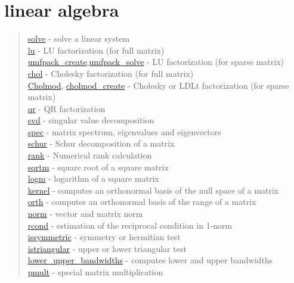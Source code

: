 \chapter*{linear algebra}

\begin{quote}
\noindent
\hyperlink{solve}{solve} - solve a linear system\\
\hyperlink{lu}{lu} - LU factorization (for full matrix) \\
\hyperlink{umfpack_create}{umfpack\_create},\hyperlink{umfpack_solve}{umfpack\_solve}
- LU factorization (for sparse matrix) \\
\hyperlink{chol}{chol} - Cholesky factorization (for full matrix) \\
\hyperlink{Cholmod}{Cholmod}, \hyperlink{cholmod_create}{cholmod\_create} - Cholesky or LDLt factorization (for sparse matrix) \\
\hyperlink{qr}{qr} - QR factorization \\
\hyperlink{svd}{svd} - singular value decomposition \\
\hyperlink{spec}{spec} - matrix spectrum, eigenvalues and eigenvectors\\
\hyperlink{schur}{schur} - Schur decomposition of a matrix \\
\hyperlink{rank}{rank} - Numerical rank calculation \\
\hyperlink{sqrtm}{sqrtm} - square root of a square matrix \\ %
\hyperlink{logm}{logm} - logarithm of a square matrix \\ %
\hyperlink{kernel}{kernel} - computes an orthonormal basis of the null space of a matrix\\
\hyperlink{orth}{orth} - computes an orthonormal basis of the range of a matrix\\
\hyperlink{norm}{norm} - vector and matrix norm\\
\hyperlink{rcond}{rcond} - estimation of the reciprocal condition in 1-norm\\
\hyperlink{issymmetric}{issymmetric} - symmetry or hermitian test\\
\hyperlink{istriangular}{istriangular} - upper or lower triangular test\\
\hyperlink{lower_upper_bandwidths}{lower\_upper\_bandwidths} - computes lower and upper bandwidths\\
\hyperlink{pmult}{pmult} - special matrix multiplication\\
\end{quote}

 
 
 
 

 





 
 
 
 





